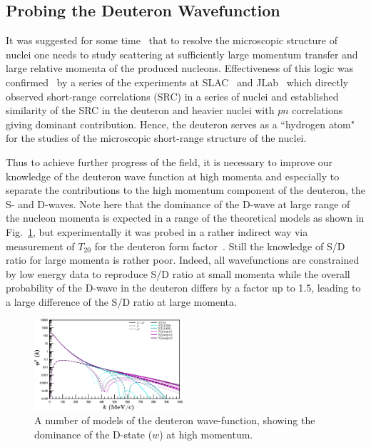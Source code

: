 \subsection{Probing the Deuteron Wavefunction}

It was suggested for some time~\cite{Frankfurt:1981mk} that to resolve the microscopic structure of nuclei one needs to study scattering at sufficiently large momentum transfer and large relative momenta of the produced nucleons. Effectiveness of this logic was confirmed~\cite{Arrington:2011xs} by a series of the experiments at SLAC~\cite{Frankfurt:1993sp} and JLab~\cite{Arrington:1998ps,Fomin:2011ng} which directly observed short-range correlations (SRC) in a series of nuclei and established similarity of the SRC in the deuteron and heavier nuclei with $pn$ correlations giving dominant contribution.  Hence, the deuteron serves as a ``hydrogen atom" for the studies of the microscopic short-range structure  of the nuclei.

Thus to achieve further progress of the field, it is necessary to improve our knowledge of the deuteron wave function at high momenta and especially to separate the contributions to the high momentum component of the deuteron, the S- and D-waves. Note here that the dominance of the D-wave at large range of the nucleon momenta is expected in a range of the theoretical models as shown in Fig.~\ref{sd-wf}, but experimentally it was probed in a rather indirect way via measurement of $T_{20}$ for the deuteron form factor~\cite{Garcon:2001sz}. Still the knowledge of S/D ratio for large momenta is rather poor. Indeed, all wavefunctions are constrained by low energy data to reproduce S/D ratio at small momenta while the overall probability of the D-wave in the deuteron differs by a factor up to 1.5, leading to a large difference of the S/D ratio at large momenta.

\begin{figure}
\begin{center}
\includegraphics[width=0.49\textwidth]{figs/sd_wf.eps}
\caption{\label{sd-wf} A number of models of the deuteron wave-function, showing the dominance of the D-state ($w$) at high momentum.}
\end{center}
\end{figure}

